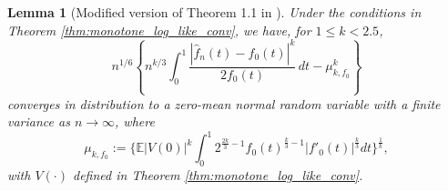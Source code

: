 \documentclass[12pt,letterpaper, twoside, openany]{article}
\theoremstyle{plain}
\newtheorem{lemma}[theorem]{Lemma}
\begin{document}
\begin{lemma}[Modified version of Theorem 1.1 in \cite{Kulikov2005}]
\label{lem:Lk_dist}
Under the conditions in Theorem \ref{thm:monotone_log_like_conv}, we have, for $1 \leq k < 2.5$,
\begin{equation*}
	n^{1/6}\left\{n^{k/3} \int_0^1 \frac{|\hat{f}_n(t) - f_0(t)|^k}{2f_0(t)}\, dt - \mu_{k, f_0}^k\right\}
\end{equation*}
converges in distribution to a zero-mean normal random variable with a finite variance as $n\to\infty$,
where
\begin{equation*}
	\mu_{k,f_0} := \bigg\{ \mathbb{E}|V(0)|^k \int^1_0 2^{\frac{2k}{3} -1} f_0(t)^{\frac{k}{3}- 1} |f'_0(t)|^{\frac{k}{3}} dt \bigg \}^{\frac{1}{k}},
\end{equation*}
with $V(\cdot)$ defined in Theorem \ref{thm:monotone_log_like_conv}.
\end{lemma}
\end{document}
